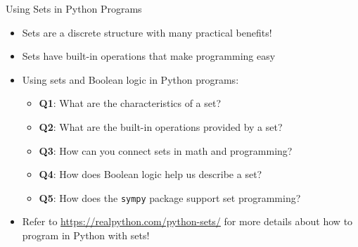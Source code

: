 \documentclass[14pt,aspectratio=169]{beamer}
\begin{document}
%
\begin{frame}{Using Sets in Python Programs}
  \begin{itemize}
    \item Sets are a discrete structure with many practical benefits!
      \vspace*{-.2in}
    \item Sets have built-in operations that make programming easy
      \vspace*{-.2in}
    \item Using sets and Boolean logic in Python programs:
      \begin{itemize}
        \item {\bf Q1}: What are the characteristics of a set?
        \item {\bf Q2}: What are the built-in operations provided by a set?
        \item {\bf Q3}: How can you connect sets in math and programming?
        \item {\bf Q4}: How does Boolean logic help us describe a set?
        \item {\bf Q5}: How does the {\tt sympy} package support set programming?
      \end{itemize}
      \vspace*{-.2in}
    \item Refer to \url{https://realpython.com/python-sets/} for more details
      about how to program in Python with sets!
  \end{itemize}
\end{frame}
\end{document}
